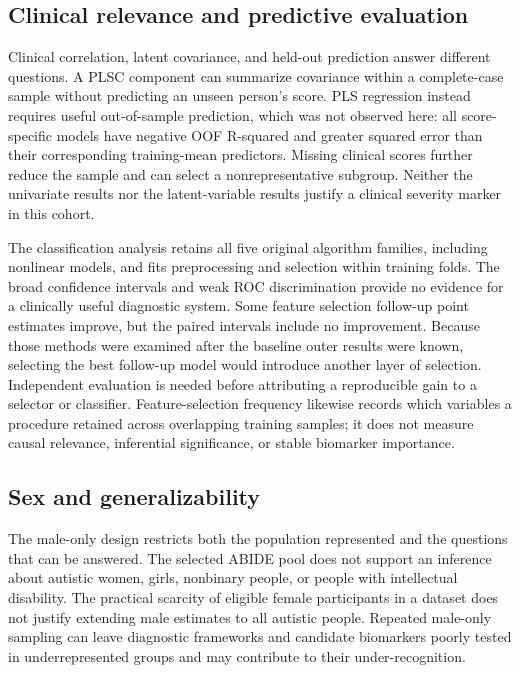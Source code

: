 \documentclass[10pt,letterpaper]{article}
\begin{document}
\subsection*{Clinical relevance and predictive evaluation}
Clinical correlation, latent covariance, and held-out prediction answer different
questions. A PLSC component can summarize covariance within a complete-case
sample without predicting an unseen person's score. PLS regression instead
requires useful out-of-sample prediction, which was not observed here: all
score-specific models have negative OOF R-squared and greater squared error
than their corresponding training-mean predictors. Missing clinical scores
further reduce the sample and can select a nonrepresentative subgroup. Neither
the univariate results nor the latent-variable results justify a clinical
severity marker in this cohort.

The classification analysis retains all five original algorithm families,
including nonlinear models, and fits preprocessing and selection within
training folds. The broad confidence intervals and weak ROC discrimination
provide no evidence for a clinically useful diagnostic system. Some feature
selection follow-up point estimates improve, but the paired intervals include
no improvement. Because those methods were examined after the baseline outer
results were known, selecting the best follow-up model would introduce another
layer of selection. Independent evaluation is needed before attributing a
reproducible gain to a selector or classifier. Feature-selection frequency
likewise records which variables a procedure retained across overlapping
training samples; it does not measure causal relevance, inferential significance,
or stable biomarker importance.

\subsection*{Sex and generalizability}
The male-only design restricts both the population represented and the questions
that can be answered. The selected ABIDE pool does not support an inference about
autistic women, girls, nonbinary people, or people with intellectual disability.
The practical scarcity of eligible female participants in a dataset does not
justify extending male estimates to all autistic people. Repeated male-only
sampling can leave diagnostic frameworks and candidate biomarkers poorly tested
in underrepresented groups and may contribute to their under-recognition.
\end{document}
